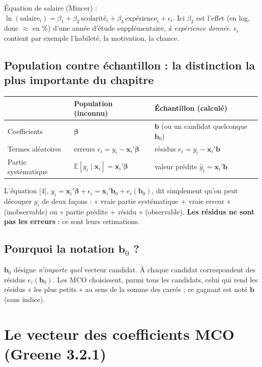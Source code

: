 \documentclass[11pt,a4paper]{article}
\newcommand{\vb}{\mathbf{b}}
\newcommand{\vx}{\mathbf{x}}
\newcommand{\vbeta}{\bm{\beta}}
\newcommand{\E}{\mathbb{E}}
\begin{document}
\begin{exemple}[title={Exemple économique}]
Équation de salaire (Mincer) : $\ln(\text{salaire}_i)=\beta_1+\beta_2\,\text{scolarité}_i+\beta_3\,\text{expérience}_i+\epsilon_i$. Ici $\beta_2$ est l'effet (en log, donc $\approx$ en \%) d'une année d'étude supplémentaire, \emph{à expérience donnée}. $\epsilon_i$ contient par exemple l'habileté, la motivation, la chance.
\end{exemple}

\subsection{Population contre échantillon : la distinction la plus importante du chapitre}
\begin{center}
\begin{tabular}{@{}lll@{}}
\toprule
& Population (inconnu) & Échantillon (calculé) \\
\midrule
Coefficients & $\vbeta$ & $\vb$ (ou un candidat quelconque $\vb_0$) \\
Termes aléatoires & erreurs $\epsilon_i=y_i-\vx_i'\vbeta$ & résidus $e_i=y_i-\vx_i'\vb$ \\
Partie systématique & $\E[y_i\mid\vx_i]=\vx_i'\vbeta$ & valeur prédite $\hat y_i=\vx_i'\vb$ \\
\bottomrule
\end{tabular}
\end{center}
L'équation [4], $y_i=\vx_i'\vbeta+\epsilon_i=\vx_i'\vb_0+e_i(\vb_0)$, dit simplement qu'on peut découper $y_i$ de deux façons : « vraie partie systématique + vraie erreur » (inobservable) ou « partie prédite + résidu » (observable). \textbf{Les résidus ne sont pas les erreurs} : ce sont leurs estimations.

\subsection{Pourquoi la notation $\vb_0$ ?}
$\vb_0$ désigne \emph{n'importe quel} vecteur candidat. À chaque candidat correspondent des résidus $e_i(\vb_0)$. Les MCO choisissent, parmi tous les candidats, celui qui rend les résidus « les plus petits » au sens de la somme des carrés ; ce gagnant est noté $\vb$ (sans indice).

\section{Le vecteur des coefficients MCO (Greene 3.2.1)}
\end{document}
